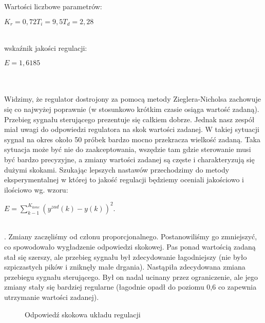 Wartości liczbowe parametrów:
\begin{center}
$K_{r}=0,72 T_{i}=9,5 T_{d}=2,28$
\end{center}
~\\wskaźnik jakości regulacji:
\begin{center}
$E=1,6185$
\end{center}
~\\\\Widzimy, że regulator dostrojony za pomocą metody Zieglera-Nicholsa zachowuje się co najwyżej poprawnie (w stosunkowo krótkim czasie osiąga wartość zadaną). Przebieg sygnału sterującego prezentuje się całkiem dobrze. Jednak nasz zespół miał uwagi do odpowiedzi regulatora na skok wartości zadanej. W takiej sytuacji sygnał na okres około 50 próbek bardzo mocno przekracza wielkość zadaną. Taka sytuacja może być nie do zaakceptowania, wszędzie tam gdzie sterowanie musi być bardzo precyzyjne, a zmiany wartości zadanej są częste i charakteryzują się dużymi skokami. Szukając lepszych nastawów przechodzimy do metody eksperymentalnej w której to jakość regulacji będziemy oceniali jakościowo i ilościowo wg. wzoru:
\begin{center}
$E=\sum_{k-1}^{K_{konc}}(y^{zad}(k)-y(k))^{2}$.
\end{center}

~\\
. Zmiany zaczęliśmy od członu proporcjonalnego. Postanowiliśmy go zmniejszyć, co spowodowało wygładzenie odpowiedzi skokowej. Pas ponad wartością zadaną stał się szerszy, ale przebieg sygnału był zdecydowanie łagodniejszy (nie było szpiczastych pików i zniknęły małe drgania). Nastąpiła zdecydowana zmiana przebiegu sygnału sterującego. Był on nadal ucinany przez ograniczenie, ale jego zmiany stały się bardziej regularne (łagodnie opadł do poziomu 0,6 co zapewnia utrzymanie wartości zadanej).
\begin{figure}[h]
    \centering
    \caption{Odpowiedź skokowa układu regulacji}
    \label{zad5_niegasnące_oscylacje}
\end{figure}

